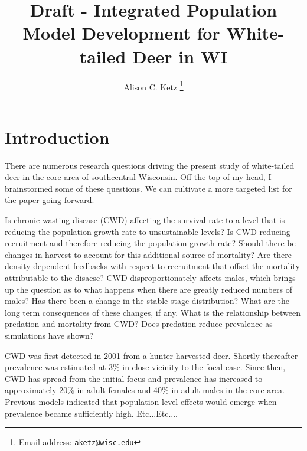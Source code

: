 \documentclass[12pt]{article}\usepackage[]{graphicx}\usepackage[]{color}
\title{Draft - Integrated Population Model Development for White-tailed Deer in WI}
\author[1]{Alison C. Ketz \thanks{Email address: \texttt{aketz@wisc.edu}}}
\affil{Department of Forest and Wildlife Ecology, University of WI, Madison USA 53706}
\begin{document}
\maketitle










\section{Introduction}

There are numerous research questions driving the present study of white-tailed deer in the core area of southcentral Wisconsin. Off the top of my head, I brainstormed some of these questions. We can cultivate a more targeted list for the paper going forward. 

Is chronic wasting disease (CWD) affecting the survival rate to a level that is reducing the population growth rate to unsustainable levels? Is CWD reducing recruitment and therefore reducing the population growth rate? Should there be changes in harvest to account for this additional source of mortality? Are there density dependent feedbacks with respect to recruitment that offset the mortality attributable to the disaese? CWD disproportionately affects males, which brings up the question as to what happens when there are greatly reduced numbers of males? Has there been a change in the stable stage distribution? What are the long term consequences of these changes, if any. What is the relationship between predation and mortality from CWD? Does predation reduce prevalence as simulations have shown?

CWD was first detected in 2001 from a hunter harvested deer. Shortly thereafter prevalence was estimated at 3\% in close vicinity to the focal case. Since then, CWD has spread from the initial focus and prevalence has increased to approximately 20\% in adult females and 40\% in adult males in the core area. Previous models indicated that population level effects would emerge when prevalence became sufficiently high. Etc...Etc.... 
\end{document}
